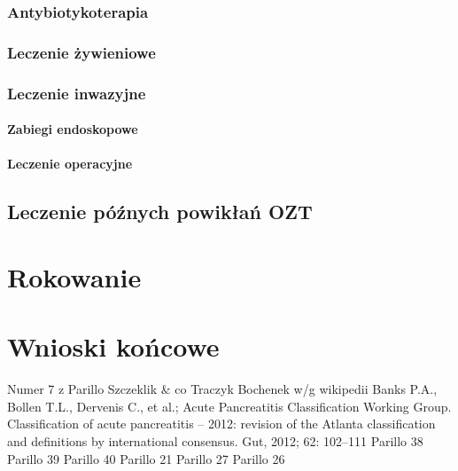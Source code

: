 \documentclass[a4paper, 12pt]{report}
\begin{document}
\subsection{Antybiotykoterapia}



\subsection{Leczenie żywieniowe}

\subsection{Leczenie inwazyjne}
\subsubsection{Zabiegi endoskopowe}
\subsubsection{Leczenie operacyjne}

\section{Leczenie późnych powikłań OZT}

\chapter{Rokowanie}

\chapter{Wnioski końcowe}

\begin{thebibliography}{99}
 Numer 7 z Parillo
 Szczeklik \& co
 Traczyk
 Bochenek w/g wikipedii
 Banks P.A., Bollen T.L., Dervenis C., et al.; Acute
  Pancreatitis Classification Working Group. Classification of acute
  pancreatitis – 2012: revision of the Atlanta classification and
  definitions by international consensus. Gut, 2012; 62: 102–111
 Parillo 38
 Parillo 39
 Parillo 40
 Parillo 21
 Parillo 27
 Parillo 26
\end{thebibliography}
\end{document}
